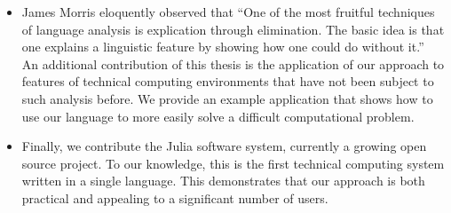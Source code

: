 \begin{itemize}




\item James Morris eloquently observed that
``One of the most fruitful techniques of language analysis is explication through
elimination.
The basic idea is that one explains a linguistic feature by showing
how one could do without it.''~\cite{morris}
An additional contribution of this thesis is the application of our approach to
features of technical computing environments that have not been subject to such
analysis before.
We provide an example application that shows how to use our language to
more easily solve a difficult computational problem.


\item Finally, we contribute the Julia software system, currently a
growing open source project.
To our knowledge, this is the first technical computing system written in a
single language.
This demonstrates that our approach is both practical and appealing to a
significant number of users.

\end{itemize}

